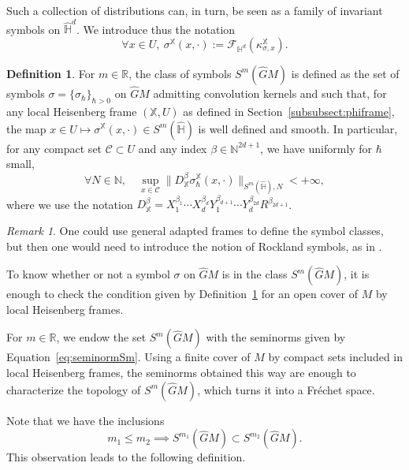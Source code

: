 \documentclass[12pt,a4paper]{amsart}
\theoremstyle{plain}
\theoremstyle{definition}
\newtheorem{definition}[theorem]{Definition}
\theoremstyle{remark}
\newtheorem{remark}[theorem]{Remark}
\numberwithin{equation}{section}
\theoremstyle{definition}
\def\R{{\mathbb R}}%
\def\N{{\mathbb N}}%
\def \bX{\mathbb{X}}
\def \Heis{\mathbb{H}}
\def \Ghat{\widehat{G}}
\def \Hhat{\widehat{\Heis}}
\def \cF{\mathcal{F}}
\numberwithin{equation}{section}
\begin{document}
Such a collection of distributions can, in turn, be seen as a family of invariant symbols on $\Hhat^d$. We introduce thus the notation
\begin{equation}
\label{eq:symframe}
    \forall x \in U,\ \sigma^\bX(x,\cdot) := \cF_{\Heis^d}(\kappa_{\sigma,x}^\bX).
\end{equation}

\begin{definition}
\label{def:symclassGhatM}
    For $m\in\R$, the class of symbols $S^m(\Ghat M)$ is defined as the set of symbols $\sigma = \{\sigma_\hbar\}_{\hbar>0}$ on $\Ghat M$ admitting convolution kernels and such that, for any local Heisenberg frame $(\bX,U)$ as defined in Section~\ref{subsubsect:phiframe}, the map $x\in U\mapsto \sigma^\bX(x,\cdot)\in S^m(\Hhat)$ is well defined and smooth. In particular, for any compact set $\mathcal{C}\subset U$ and any index $\beta\in\N^{2d+1}$, we have uniformly for $\hbar$ small,
    \begin{equation}
    \label{eq:seminormSm}
        \forall N\in\N,\quad \sup_{x\in\mathcal{C}}\|D_{\bX}^\beta \sigma_\hbar^\bX(x,\cdot)\|_{S^m(\Hhat),N} < +\infty,
    \end{equation}
    where we use the notation $D_{\bX}^\beta = X_1^{\beta_1}\cdots X_d^{\beta_d}Y_1^{\beta_{d+1}}\cdots Y_d^{\beta_{2d}}R^{\beta_{2d+1}}$.
\end{definition}

\begin{remark}
    One could use general adapted frames to define the symbol classes, but then one would need to introduce the notion of Rockland symbols, as in \cite{FFF24}.
\end{remark}

To know whether or not a symbol $\sigma$ on $\Ghat M$ is in the class $S^m(\Ghat M)$, it is enough to check the condition given by Definition~\ref{def:symclassGhatM} for an open cover of $M$ by local Heisenberg frames. 

For $m\in\R$, we endow the set $S^m(\Ghat M)$ with the seminorms given by Equation~\eqref{eq:seminormSm}. Using a finite cover of $M$ by compact sets included in local Heisenberg frames, the seminorms obtained this way are enough to characterize the topology of $S^m(\Ghat M)$, which turns it into a Fréchet space.

Note that we have the inclusions
\begin{equation*}
    m_1 \leq m_2 \implies S^{m_1}(\Ghat M)\subset S^{m_2}(\Ghat M).
\end{equation*}
This observation leads to the following definition.
\end{document}
